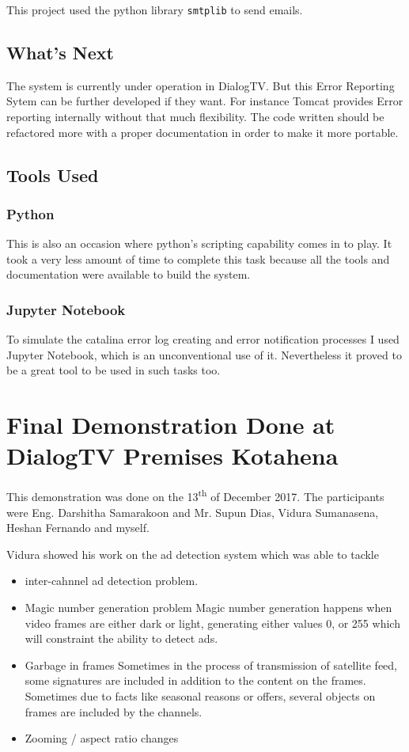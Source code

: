 This project used the python library \texttt{smtplib} to send emails.

\subsection{What's Next}
The system is currently under operation in DialogTV. But this Error Reporting Sytem can be further developed if they want. For instance Tomcat provides Error reporting internally without that much flexibility. The code written should be refactored more with a proper documentation in order to make it more portable.

\subsection{Tools Used}

\subsubsection{Python}
This is also an occasion where python's scripting capability comes in to play.  It took a very less amount of time to complete this task because all the tools and documentation were available to build the system.

\subsubsection{Jupyter Notebook}
To simulate the catalina error log creating and error notification processes I used Jupyter Notebook, which is an unconventional use of it. Nevertheless it proved to be a great tool to be used in such tasks too.

\section{Final Demonstration Done at DialogTV Premises Kotahena}
This demonstration was done on the 13\textsuperscript{th} of December 2017. The participants were Eng. Darshitha Samarakoon and Mr. Supun Dias, Vidura Sumanasena, Heshan Fernando and myself. 

Vidura showed his work on the ad detection system which was able to tackle
\begin{itemize}
\item inter-cahnnel ad detection problem. 
\item Magic number generation problem
\subitem Magic number generation happens when video frames are either dark or light, generating either values 0, or 255 which will constraint the ability to detect ads.
\item Garbage in frames
\subitem Sometimes in the process of transmission of satellite feed, some signatures are included in addition to the content on the frames.
\subitem Sometimes due to facts like seasonal reasons or offers, several objects on frames are included by the channels.
\item Zooming / aspect ratio changes
\end{itemize}

